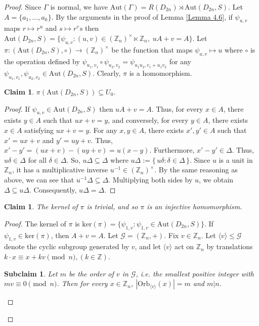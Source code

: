 \documentclass[12pt,reqno,a4paper]{amsart}
\theoremstyle{definition}
\newtheorem{claim}[defn]{Claim}
\newtheorem{subclaim}[defn]{Subclaim}
\begin{document}
\begin{proof}
Since $\Gamma$ is normal, we have $\mathrm{Aut}(\Gamma)=R(D_{2n})\rtimes\mathrm{Aut}(D_{2n},S)$. Let $A=\{a_1,\dots,a_k\}$. By the arguments in the proof of Lemma \ref{Lemma 4.6}, if \(\psi_{u,v}\) maps $r\mapsto r^u$ and $s\mapsto r^v s$ then
$\mathrm{Aut}(D_{2n},S)=
\{\psi_{u,v}:(u,v)\in(\mathbb Z_n)^\times\ltimes\mathbb Z_n,\; uA+v=A\}$.    
Let \(\pi:(\mathrm{Aut}(D_{2n},S),\circ)\to(\mathbb Z_n)^\times\) be the function that maps \(\psi_{u,v}\mapsto u\) where $\circ$ is the operation defined by $\psi_{u_{1},v_{1}}\circ\psi_{u_{2},v_{2}}=\psi_{u_{1}u_{2},v_{1}+u_{1}v_{2}}$ for any  $\psi_{u_{1},v_{1}},\psi_{u_{2},v_{2}}\in\mathrm{Aut}(D_{2n},S)$. 
Clearly, $\pi$ is a homomorphism.

\begin{claim}\label{Claim 4.9}
{\em $\pi(\mathrm{Aut}(D_{2n},S))\subseteq U_{0}$.
}
\end{claim}

\begin{proof}
If \(\psi_{u,v}\in\mathrm{Aut}(D_{2n},S)\) then $uA + v = A$. 
Thus, for every $x \in A$, there exists $y \in A$ such that $ux + v = y$, 
and conversely, for every $y \in A$, there exists $x \in A$ satisfying $ux + v = y$.
For any $x,y\in A$, there exists $x',y'\in A$ such that $x'=ux+v$ and $y'=uy+v$. Thus,
$x'- y'= (ux+v)-(uy+v)=u(x-y)$. Furthermore, $x'-y'\in\Delta$.
Thus, $u \delta \in \Delta$ for all $\delta \in \Delta$. 
So, $u\Delta \subseteq \Delta
\text{ where } 
u\Delta := \{\,u \delta : \delta \in \Delta\,\}$.
Since $u$ is a unit in $\mathbb{Z}_n$, it has a multiplicative inverse $u^{-1}\in (\mathbb{Z}_n)^\times$.  
By the same reasoning as above, we can see that
$u^{-1}\Delta \subseteq \Delta$. Multiplying both sides by $u$, we obtain $\Delta \subseteq u\Delta$.
Consequently, $u\Delta = \Delta$.
 \end{proof}

\begin{claim}\label{Claim 4.10}
{\em The kernel of $\pi$ is trivial, and so $\pi$ is an injective homomorphism.}
\end{claim}

\begin{proof}
The kernel of $\pi$ is $\mathrm{ker}(\pi)=\{\psi_{1,v}: \psi_{1,v}\in \mathrm{Aut}(D_{2n},S)\}$. If $\psi_{1,v}\in \mathrm{ker}(\pi)$, then $A+v=A$.  
Let $\mathcal{G}=(\mathbb{Z}_{n},+)$. Fix $v\in\mathbb Z_n$.  
Let $\langle v\rangle\le\mathcal G$ denote the cyclic subgroup generated by $v$, and let $\langle v\rangle$ act on $\mathbb Z_n$ by translations
$k\cdot x \equiv x + kv \pmod n, (k\in\mathbb Z)$.
\begin{subclaim}\label{subclaim 4.11}
{\em 
Let $m$ be the order of $v$ in $\mathcal G$, i.e. the smallest positive integer with $m v\equiv 0\pmod n$.
Then for every $x\in\mathbb Z_n$,
$|\mathrm{Orb}_{\langle v\rangle}(x)| = m$ and $m|n$.}
\end{subclaim}


\end{proof}
\end{proof}
\end{document}
